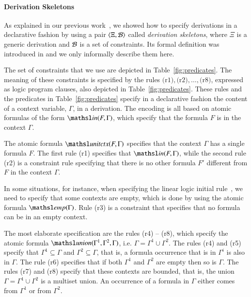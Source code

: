\documentclass[a4paper,10pt]{article}
\newcommand{\elin}[2]{\ensuremath{{\tsl{unitctx}(\ensuremath{#1}, \ensuremath{#2})}}}
\newcommand{\emp}[1]{\ensuremath{{\tsl{emp}(\ensuremath{#1})}}}
\newcommand{\union}[3]{\ensuremath{{\tsl{union}(\ensuremath{#1},\ensuremath{#2},\ensuremath{ #3})}}}
\newcommand{\In}[2]{\ensuremath{\tsl{in}(\ensuremath{#1},\ensuremath{#2})}}
\begin{document}
\paragraph{Derivation Skeletons}
As explained in our previous work~\cite{nigam13iclp}, we showed how to specify derivations in a declarative fashion 
by using a pair $\langle\Xi, {\cal B}\rangle$ called \emph{derivation skeletons}, where $\Xi$ is a generic derivation and 
${\cal B}$ is a set of constraints.
Its formal definition was introduced in \cite{nigam13iclp} and we only informally describe them here.   

The set of constraints that we use are depicted in Table~\ref{fig:predicates}.
The meaning of these constraints is specified by the rules $\textrm{(r1)},
\textrm{(r2)},\ldots, \textrm{(r8)}$, expressed as logic program clauses, 
also depicted in Table~\ref{fig:predicates}. These
rules and the predicates in Table~\ref{fig:predicates} specify in a declarative 
fashion the content of a context variable, $\Gamma$, in a derivation.
The encoding is all based on atomic formulas of the form $\In{F}{\Gamma}$, which 
specify that the formula $F$ is in the context $\Gamma$. 

The atomic formula $\elin{F}{\Gamma}$ specifies that the context $\Gamma$ has a
single formula $F$. 
The first rule (r1) specifies that $\In{F}{\Gamma}$, while the second rule (r2) is a constraint
rule specifying that there is no other formula $F'$ different from $F$ in the context $\Gamma$.

In some situations, for instance, when specifying the linear logic initial rule~\cite{girard87tcs}, 
we need to specify that some contexts are empty, which is done by using the atomic formula $\emp{\Gamma}$.  
Rule (r3) is a constraint that specifies that no formula can be in an empty context.
 
The most elaborate specification are the rules (r4) -- (r8), which specify the atomic formula 
$\union{\Gamma^1} {\Gamma^2} {\Gamma}$, i.e. $\Gamma = \Gamma^1 \cup \Gamma^2$.
The rules (r4) and (r5) specify that $\Gamma^1 \subseteq \Gamma$ and $\Gamma^2 \subseteq \Gamma$, 
that is, a formula occurrence that is in $\Gamma^i$ is also in $\Gamma$. The rule (r6) specifies that 
if both $\Gamma^1$ and $\Gamma^2$ are empty then so is $\Gamma$. 
The rules (r7) and (r8) 
specify that these contexts are bounded, that is, the union 
$\Gamma = \Gamma^1 \cup \Gamma^2$ is a multiset union. An occurrence of a formula in $\Gamma$ either comes
from $\Gamma^1$ or from $\Gamma^2$.  
\end{document}

